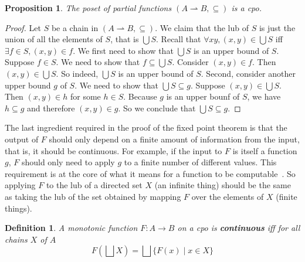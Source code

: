 \documentclass{tufte-handout}
\newcommand{\pto}[0]{\rightharpoonup}
\newtheorem{proposition}[theorem]{Proposition}
\newtheorem{definition}{Definition}%
\begin{document}

\begin{proposition}
  The poset of partial functions $(A\pto B,\subseteq)$ is a
  cpo.
\end{proposition}
\begin{proof}
  Let $S$ be a chain in $(A\pto B,\subseteq)$.  We claim
  that the lub of $S$ is just the union of all the elements of $S$,
  that is $\bigcup S$. Recall that $\forall x y, (x,y) \in \bigcup S$
  iff $\exists f \in S, (x,y) \in f$.
%
  We first need to show that $\bigcup S$ is an upper bound of $S$.
  Suppose $f \in S$. We need to show that $f \subseteq \bigcup S$.
  Consider $(x,y) \in f$. Then $(x,y) \in \bigcup S$. So indeed,
  $\bigcup S$ is an upper bound of $S$.  Second, consider another
  upper bound $g$ of $S$.  We need to show that $\bigcup S \subseteq
  g$. Suppose $(x,y) \in \bigcup S$.  Then $(x,y) \in h$ for some $h
  \in S$. Because $g$ is an upper bounf of $S$, we have $h \subseteq
  g$ and therefore $(x,y) \in g$. So we conclude that $\bigcup S
  \subseteq g$.
\end{proof}

The last ingredient required in the proof of the fixed point theorem
is that the output of $F$ should only depend on a finite amount of
information from the input, that is, it should be continuous. For
example, if the input to $F$ is itself a function $g$, $F$ should only
need to apply $g$ to a finite number of different values.  This
requirement is at the core of what it means for a function to be
computable~\citep{Gunter:1990aa}.  So applying $F$ to the lub of a
directed set $X$ (an infinite thing) should be the same as taking the
lub of the set obtained by mapping $F$ over the elements of $X$
(finite things).

\begin{definition}
  A monotonic function $F : A {\to} B$ on a cpo is
  \textbf{\emph{continuous}} iff for all chains $X$ of $A$
  \[
  F(\bigsqcup X) = \bigsqcup \{ F(x) \mid x \in X \}
  \]
\end{definition}
\end{document}
